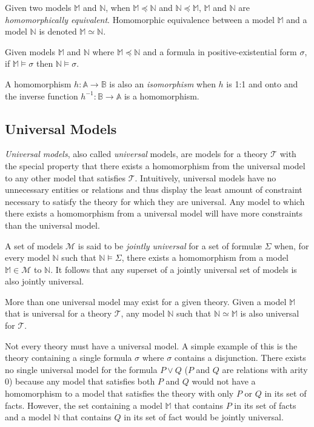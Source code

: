 		Given two models $\mathbb{M}$ and $\mathbb{N}$, when $\mathbb{M}
		\preceq \mathbb{N}$ and $\mathbb{N} \preceq \mathbb{M}$, $\mathbb{M}$
		and $\mathbb{N}$ are \emph{homomorphically equivalent}. Homomorphic
		equivalence between a model $\mathbb{M}$ and a model $\mathbb{N}$ is
		denoted $\mathbb{M} \simeq \mathbb{N}$.

		Given models $\mathbb{M}$ and $\mathbb{N}$ where $\mathbb{M} \preceq
		\mathbb{N}$ and a formula in positive-existential form $\sigma$, if
		$\mathbb{M} \models \sigma$ then $\mathbb{N} \models \sigma$.

		A homomorphism $h : \mathbb{A} \to \mathbb{B}$ is also an
		\emph{isomorphism} when $h$ is 1:1 and onto and the inverse function
		$h^{-1} : \mathbb{B} \to \mathbb{A}$ is a homomorphism.

	\subsection{Universal Models}
	\label{sec:technical_background.universal_models}

		\emph{Universal models}, also called \emph{universal} models, are models
		for a theory $\mathcal{T}$ with the special property that there exists a
		homomorphism from the universal model to any other model that satisfies
		$\mathcal{T}$. Intuitively, universal models have no unnecessary entities or
		relations and thus display the least amount of constraint necessary to
		satisfy the theory for which they are universal. Any model to which there
		exists a homomorphism from a universal model will have more constraints
		than the universal model.

		A set of models $\mathcal{M}$ is said to be \emph{jointly universal} for
		a set of formul{\ae} $\Sigma$ when, for every model $\mathbb{N}$ such
		that $\mathbb{N} \models \Sigma$, there exists a homomorphism from a
		model $\mathbb{M} \in \mathcal{M}$ to $\mathbb{N}$. It follows that any
		superset of a jointly universal set of models is also jointly universal.

		More than one universal model may exist for a given theory. Given a model
		$\mathbb{M}$ that is universal for a theory $\mathcal{T}$, any model $\mathbb{N}$
		such that $\mathbb{N} \simeq \mathbb{M}$ is also universal for $\mathcal{T}$.

		Not every theory must have a universal model. A simple example of this is
		the theory containing a single formula $\sigma$ where $\sigma$ contains
		a disjunction. There exists no single universal model for the formula $P
		\vee Q$ ($P$ and $Q$ are relations with arity $0$) because any model that
		satisfies both $P$ and $Q$ would not have a homomorphism to a model
		that satisfies the theory with only $P$ or $Q$ in its set of facts.
		However, the set containing a model $\mathbb{M}$ that contains $P$ in
		its set of facts and a model $\mathbb{N}$ that contains $Q$ in its
		set of fact would be jointly universal.

